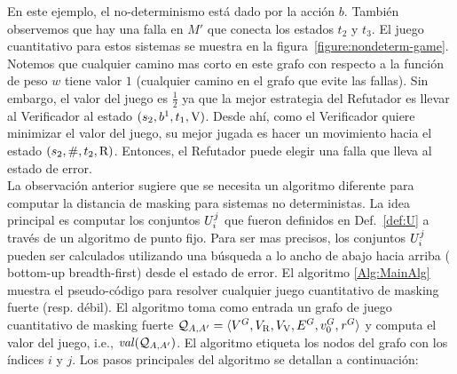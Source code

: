 En este ejemplo, el no-determinismo está dado por la acción $b$. También observemos que hay una falla en $M'$ que conecta los estados $t_2$ y $t_3$. El juego cuantitativo para estos sistemas se muestra en la figura~\ref{figure:nondeterm-game}. Notemos que cualquier camino mas corto en este grafo con respecto a la función de peso $w$ tiene valor $1$ (cualquier camino en el grafo que evite las fallas). Sin embargo, el valor del juego es $\frac{1}{2}$ ya que la mejor estrategia del Refutador es llevar al Verificador al estado $(s_2,b^1,t_1,\mathrm{V})$. 
Desde ahí, como el Verificador quiere minimizar el valor del juego, su mejor jugada es hacer un movimiento hacia el estado $(s_2,\#,t_2,\mathrm{R})$. Entonces, el Refutador puede elegir una falla que lleva al estado de error. \\

La observación anterior sugiere que se necesita un algoritmo diferente para computar la distancia de masking para sistemas no deterministas. 
La idea principal es computar los conjuntos $U^j_i$ que fueron definidos en Def.~\ref{def:U} a través de un algoritmo de punto fijo. Para ser mas precisos, los conjuntos $U^j_i$ pueden ser calculados utilizando una búsqueda a lo ancho de abajo hacia arriba ( 
bottom-up breadth-first) desde el estado de error. 
El algoritmo \ref{Alg:MainAlg} muestra el pseudo-código para resolver cualquier juego cuantitativo de masking fuerte (resp. débil). 
El algoritmo toma como entrada un grafo de juego cuantitativo de masking fuerte  $\mathcal{Q}_{A, A'} = \langle V^G, V_{\mathrm{R}}, V_{\mathrm{V}},E^G, v_0^G, \mathit{r}^G \rangle$ 
y computa el valor del juego, i.e., $\mathit{val}(\mathcal{Q}_{A, A'})$.
El algoritmo etiqueta los nodos del grafo con los índices $i$ y $j$. 
Los pasos principales del algoritmo se detallan a continuación:


